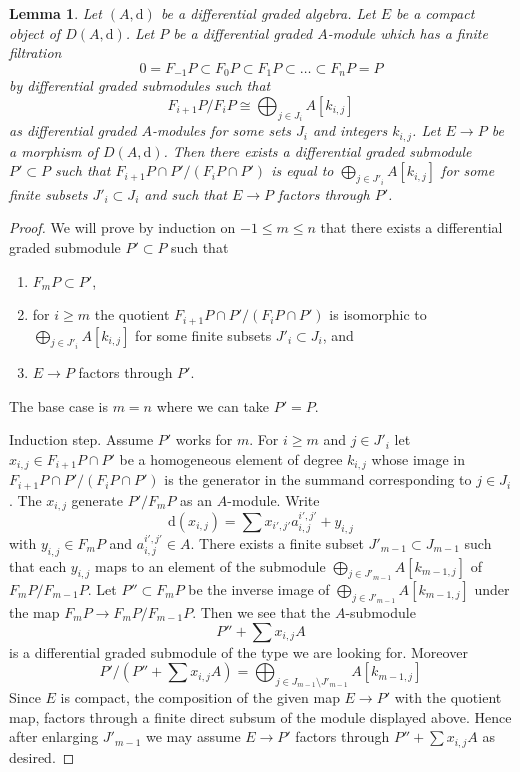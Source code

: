 \documentclass{stacks-project}
\theoremstyle{plain}
\newtheorem{lemma}[subsection]{Lemma}
\theoremstyle{definition}
\theoremstyle{remark}
\numberwithin{equation}{subsection}
\begin{document}
\begin{lemma}
\label{lemma-factor-through-nicer}
Let $(A, \text{d})$ be a differential graded algebra. Let $E$ be a compact
object of $D(A, \text{d})$. Let $P$ be a differential graded $A$-module
which has a finite filtration
$$
0 = F_{-1}P \subset F_0P \subset F_1P \subset \ldots \subset F_nP = P
$$
by differential graded submodules such that
$$
F_{i + 1}P/F_iP \cong \bigoplus\nolimits_{j \in J_i} A[k_{i, j}]
$$
as differential graded $A$-modules for some sets $J_i$ and integers $k_{i, j}$.
Let $E \to P$ be a morphism of $D(A, \text{d})$.
Then there exists a differential graded submodule $P' \subset P$ such that
$F_{i + 1}P \cap P'/(F_iP \cap P')$ is equal to
$\bigoplus_{j \in J'_i} A[k_{i, j}]$ for some finite subsets
$J'_i \subset J_i$ and such that $E \to P$ factors through $P'$.
\end{lemma}

\begin{proof}
We will prove by induction on $-1 \leq m \leq n$ that there exists
a differential graded submodule $P' \subset P$  such that
\begin{enumerate}
\item $F_mP \subset P'$,
\item for $i \geq m$ the quotient $F_{i + 1}P \cap P'/(F_iP \cap P')$ is
isomorphic to $\bigoplus_{j \in J'_i} A[k_{i, j}]$ for some finite subsets
$J'_i \subset J_i$, and
\item $E \to P$ factors through $P'$.
\end{enumerate}
The base case is $m = n$ where we can take $P' = P$.

\medskip\noindent
Induction step. Assume $P'$ works for $m$.
For $i \geq m$ and $j \in J'_i$ let $x_{i, j} \in F_{i + 1}P \cap P'$
be a homogeneous element of degree $k_{i, j}$ whose image in
$F_{i + 1}P \cap P'/(F_iP \cap P')$ is the generator in
the summand corresponding to $j \in J_i$. The
$x_{i, j}$ generate $P'/F_mP$ as an $A$-module. Write
$$
\text{d}(x_{i, j}) = \sum x_{i', j'} a_{i, j}^{i', j'} + y_{i, j}
$$
with $y_{i, j} \in F_mP$ and $a_{i, j}^{i', j'} \in A$.
There exists a finite subset
$J'_{m - 1} \subset J_{m - 1}$ such that each $y_{i, j}$ maps to
an element of the submodule $\bigoplus_{j \in J'_{m - 1}} A[k_{m - 1, j}]$
of $F_mP/F_{m - 1}P$. Let $P'' \subset F_mP$ be the inverse
image of $\bigoplus_{j \in J'_{m - 1}} A[k_{m - 1, j}]$ under
the map $F_mP \to F_mP/F_{m - 1}P$. Then we see that the $A$-submodule
$$
P'' + \sum x_{i, j}A
$$
is a differential graded submodule of the type we are looking for. Moreover
$$
P'/(P'' + \sum x_{i, j}A) =
\bigoplus\nolimits_{j \in J_{m - 1} \setminus J'_{m - 1}} A[k_{m - 1, j}]
$$
Since $E$ is compact, the composition of the given map $E \to P'$
with the quotient map, factors through a finite direct subsum of
the module displayed above. Hence after enlarging $J'_{m - 1}$
we may assume $E \to P'$ factors through
$P'' + \sum x_{i, j}A$ as desired.
\end{proof}
\end{document}
